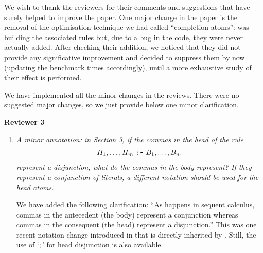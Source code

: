 \newpage
\pagestyle{empty}
\newcommand\revtext[1]{\emph{\color{blue}#1}}
We wish to thank the reviewers for their comments and suggestions that have surely helped to improve the paper. 
One major change in the paper is the removal of the optimisation technique we had called ``completion atoms'': \eclingo{} was building the associated rules but, due to a bug in the code, they were never actually added. After checking their addition, we noticed that they did not provide any significative improvement and decided to suppress them by now (updating the benchmark times accordingly), until a more exhaustive study of their effect is performed. 

We have implemented all the minor changes in the reviews. There were no suggested major changes, so we just provide below one minor clarification.

{\bf Reviewer 3}

\begin{enumerate}[label=R3.\arabic*]
\item \revtext{A minor annotation: in Section 3, if the commas in the head of the rule
\begin{align*}
    H_1,\dots,H_m  \text{ \texttt{:-} }  B_1,\dots,B_n.
\end{align*}
represent a disjunction, what do the commas in the body represent?
If they represent a conjunction of literals, a different notation should be used for the head atoms.}

We have added the following clarification: ``As happens in sequent calculus, commas in the antecedent (the body) represent a conjunction whereas commas in the consequent (the head) represent a disjunction.'' 
%
This was one recent notation change introduced in \clingo{} that is directly inherited by \eclingo{}. Still, the use of `$;$' for head disjunction is also available.
\end{enumerate}
\newpage
\pagestyle{plain}    
\setcounter{page}{1}